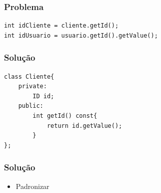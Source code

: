 \begin{frame}[fragile]
	\frametitle{Problema}

	\begin{listing}[H]
		\begin{verbatim}
int idCliente = cliente.getId();
int idUsuario = usuario.getId().getValue();
		\end{verbatim}
	\end{listing}

\end{frame}

\begin{frame}[fragile]
	\frametitle{Solução}

	\begin{listing}[H]
		\begin{verbatim}
class Cliente{
	private:
		ID id;
	public:
		int getId() const{
			return id.getValue();
		}
};
		\end{verbatim}
	\end{listing}

\end{frame}

\begin{frame}
	\frametitle{Solução}

	\begin{itemize}
		\item Padronizar
	\end{itemize}

\end{frame}
